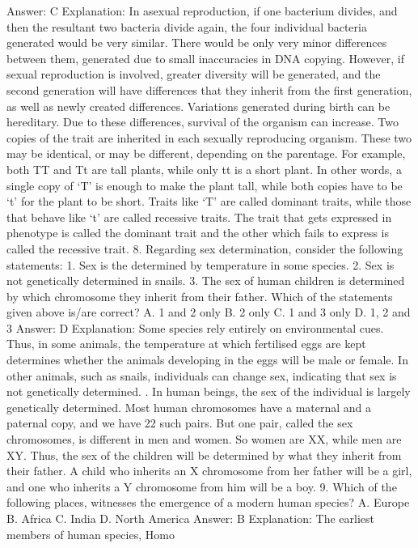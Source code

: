 Answer: C
Explanation: In asexual reproduction, if one bacterium divides, and
then the resultant two bacteria divide again, the four individual
bacteria generated would be very similar. There would be only very
minor differences between them, generated due to small
inaccuracies in DNA copying.
However, if sexual reproduction is involved, greater diversity will be
generated, and the second generation will have differences that
they inherit from the first generation, as well as newly created
differences. Variations generated during birth can be hereditary.
Due to these differences, survival of the organism can increase.
Two copies of the trait are inherited in each sexually reproducing
organism. These two may be identical, or may be different,
depending on the parentage.
For example, both TT and Tt are tall plants, while only tt is a short
plant. In other words, a single copy of ‘T’ is enough to make the plant
tall, while both copies have to be ‘t’ for the plant to be short. Traits
like ‘T’ are called dominant traits, while those that behave like ‘t’ are
called recessive traits.
The trait that gets expressed in phenotype is called the dominant
trait and the other which fails to express is called the recessive
trait.
8. Regarding sex determination, consider the following
statements:
1. Sex is the determined by temperature in some species.
2. Sex is not genetically determined in snails.
3. The sex of human children is determined by which chromosome
they inherit from their father.
Which of the statements given above is/are correct?
A. 1 and 2 only
B. 2 only
C. 1 and 3 only
D. 1, 2 and 3
Answer: D
Explanation: Some species rely entirely on environmental cues. Thus,
in some animals, the temperature at which fertilised eggs are kept
determines whether the animals developing in the eggs will be male
or female.
In other animals, such as snails, individuals can change sex, indicating
that sex is not genetically determined. . In human beings, the sex of
the individual is largely genetically determined. Most human
chromosomes have a maternal and a paternal copy, and we have 22
such pairs.
But one pair, called the sex chromosomes, is different in men and
women. So women are XX, while men are XY. Thus, the sex of the
children will be determined by what they inherit from their father.
A child who inherits an X chromosome from her father will be a girl,
and one who inherits a Y chromosome from him will be a boy.
9. Which of the following places, witnesses the emergence of a
modern human species?
A. Europe
B. Africa
C. India
D. North America
Answer: B
Explanation: The earliest members of human species, Homo
